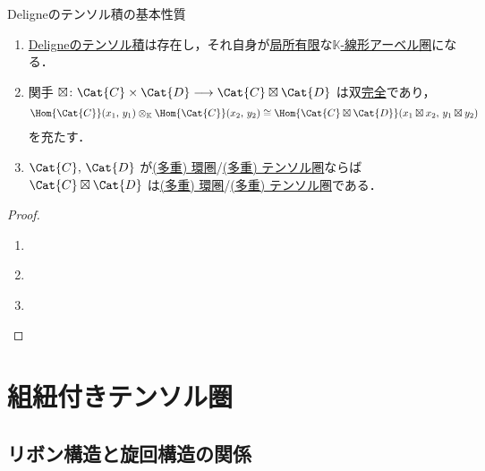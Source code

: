 \documentclass[TQFT_main]{subfiles}
\begin{document}
\begin{myprop}[label=prop:DeligneProduct]{Deligneのテンソル積の基本性質}
    \begin{enumerate}
        \item \hyperref[def:DeligneProduct]{Deligneのテンソル積}は存在し，それ自身が\hyperref[def:finite-abcat]{局所有限}な\hyperref[def:additive-cat]{$\mathbb{K}$-線形アーベル圏}になる．
        \item 関手 $\boxtimes \colon \Cat{C} \times \Cat{D} \lto \Cat{C} \boxtimes \Cat{D}$ は双\hyperref[def:additive-exact]{完全}であり，
        \begin{align}
            \Hom{\Cat{C}} (x_1,\, y_1) \otimes_{\mathbb{K}} \Hom{\Cat{C}} (x_2,\, y_2) \cong \Hom{\Cat{C} \boxtimes \Cat{D}} (x_1 \boxtimes x_2,\, y_1 \boxtimes y_2)
        \end{align}
        を充たす．
        \item $\Cat{C},\, \Cat{D}$ が\hyperref[def:ringcat]{(多重) 環圏}/\hyperref[def:tensorfusion-cat]{(多重) テンソル圏}ならば $\Cat{C} \boxtimes \Cat{D}$ は\hyperref[def:ringcat]{(多重) 環圏}/\hyperref[def:tensorfusion-cat]{(多重) テンソル圏}である．
    \end{enumerate}
    
\end{myprop}

\begin{proof}
    \begin{enumerate}
        \item ~\cite[PROPOSITION 1.11.2., p.15]{etingof2015tensor}
        \item ~\cite[PROPOSITION 1.11.2., p.15]{etingof2015tensor}
        \item ~\cite[PROPOSITION 4.6.1., p.73]{etingof2015tensor}
    \end{enumerate}
    
\end{proof}

\section{組紐付きテンソル圏}

\subsection{リボン構造と旋回構造の関係}
\end{document}
